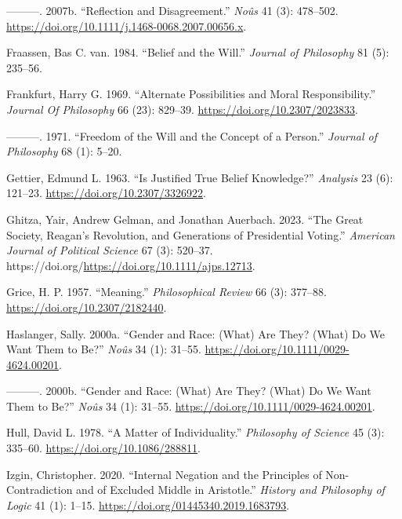 \documentclass[
  12pt,
  letterpaper,
  DIV=11,
  numbers=noendperiod]{scrartcl}
\newlength{\cslhangindent}
\newenvironment{CSLReferences}[2] %
 {\begin{list}{}{%
  \setlength{\itemindent}{0pt}
  \setlength{\leftmargin}{0pt}
  \setlength{\parsep}{0pt}
  \ifodd #1
   \setlength{\leftmargin}{\cslhangindent}
   \setlength{\itemindent}{-1\cslhangindent}
  \fi
  \setlength{\itemsep}{#2\baselineskip}}}
 {\end{list}}
\begin{document}
\begin{CSLReferences}{1}{0}
---------. 2007b. {``Reflection and Disagreement.''} \emph{Noûs} 41 (3):
478--502. \url{https://doi.org/10.1111/j.1468-0068.2007.00656.x}.

Fraassen, Bas C. van. 1984. {``Belief and the Will.''} \emph{Journal of
Philosophy} 81 (5): 235--56.

Frankfurt, Harry G. 1969. {``Alternate Possibilities and Moral
Responsibility.''} \emph{Journal Of Philosophy} 66 (23): 829--39.
\url{https://doi.org/10.2307/2023833}.

---------. 1971. {``Freedom of the Will and the Concept of a Person.''}
\emph{Journal of Philosophy} 68 (1): 5--20.

Gettier, Edmund L. 1963. {``Is Justified True Belief Knowledge?''}
\emph{Analysis} 23 (6): 121--23. \url{https://doi.org/10.2307/3326922}.

Ghitza, Yair, Andrew Gelman, and Jonathan Auerbach. 2023. {``The Great
Society, Reagan's Revolution, and Generations of Presidential Voting.''}
\emph{American Journal of Political Science} 67 (3): 520--37.
https://doi.org/\url{https://doi.org/10.1111/ajps.12713}.

Grice, H. P. 1957. {``Meaning.''} \emph{Philosophical Review} 66 (3):
377--88. \url{https://doi.org/10.2307/2182440}.

Haslanger, Sally. 2000a. {``Gender and Race: (What) Are They? (What) Do
We Want Them to Be?''} \emph{No{û}s} 34 (1): 31--55.
\url{https://doi.org/10.1111/0029-4624.00201}.

---------. 2000b. {``Gender and Race: (What) Are They? (What) Do We Want
Them to Be?''} \emph{Noûs} 34 (1): 31--55.
\url{https://doi.org/10.1111/0029-4624.00201}.

Hull, David L. 1978. {``A Matter of Individuality.''} \emph{Philosophy
of Science} 45 (3): 335--60. \url{https://doi.org/10.1086/288811}.

Izgin, Christopher. 2020. {``Internal Negation and the Principles of
Non-Contradiction and of Excluded Middle in Aristotle.''} \emph{History
and Philosophy of Logic} 41 (1): 1--15.
\url{https://doi.org/01445340.2019.1683793}.


\end{CSLReferences}
\end{document}
